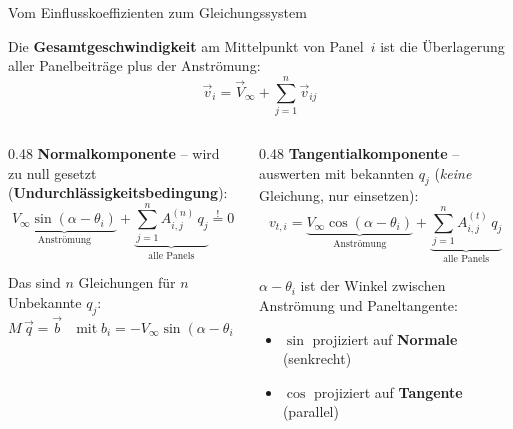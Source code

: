 \documentclass[aspectratio=169]{beamer}
\begin{document}
\begin{frame}{Vom Einflusskoeffizienten zum Gleichungssystem}
\footnotesize

Die \textbf{Gesamtgeschwindigkeit} am Mittelpunkt von Panel~$i$ ist die
Überlagerung aller Panelbeiträge plus der Anströmung:
\vspace{-1mm}
\[
  \vec{v}_i = \vec{V}_\infty + \sum_{j=1}^{n} \vec{v}_{ij}
\]

\begin{columns}[T]
\begin{column}{0.48\textwidth}
\textbf{Normalkomponente} -- wird zu null gesetzt
(\textbf{Undurchlässigkeitsbedingung}):
\vspace{-1mm}
\[
  \underbrace{V_\infty\sin(\alpha\!-\!\theta_i)}_{\text{Anströmung}}
  + \underbrace{\sum_{j=1}^{n} A^{(n)}_{i,j}\,q_j}_{\text{alle Panels}}
  \stackrel{!}{=} 0
\]

\vspace{-2mm}
Das sind $n$ Gleichungen für $n$ Unbekannte $q_j$:
\vspace{-1mm}
\[
  \boxed{M\,\vec{q} = \vec{b}}
  \quad\text{mit}\;
  b_i = -V_\infty\sin(\alpha\!-\!\theta_i)
\]
\end{column}
\begin{column}{0.48\textwidth}
\textbf{Tangentialkomponente} -- auswerten mit
bekannten $q_j$ (\emph{keine} Gleichung, nur einsetzen):
\vspace{-1mm}
\[
  v_{t,i} =
  \underbrace{V_\infty\cos(\alpha\!-\!\theta_i)}_{\text{Anströmung}}
  + \underbrace{\sum_{j=1}^{n} A^{(t)}_{i,j}\,q_j}_{\text{alle Panels}}
\]

\vspace{-2mm}
$\alpha\!-\!\theta_i$ ist der Winkel zwischen Anströmung
und Paneltangente:
\begin{itemize}\setlength\itemsep{0pt}
  \item $\sin$ projiziert auf \textbf{Normale} (senkrecht)
  \item $\cos$ projiziert auf \textbf{Tangente} (parallel)
\end{itemize}
\end{column}
\end{columns}

\end{frame}
\end{document}
